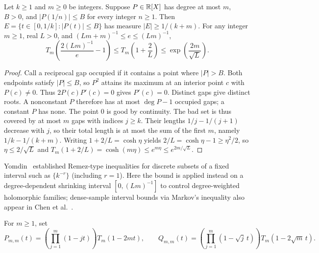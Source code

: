 \begin{theorem}
\label{thm:chebyshev-exp}
\leanok
Let $k\ge1$ and $m\ge0$ be integers. Suppose $P\in\mathbb{R}[X]$ has degree at most $m$, $B>0$, and $|P(1/n)|\le B$ for every integer $n\ge1$. Then $E=\{t\in[0,1/k]:|P(t)|\le B\}$ has measure $|E|\ge1/(k+m)$. For any integer $m\ge1$, real $L>0$, and $(Lm+m)^{-1}\le e\le(Lm)^{-1}$,
\[
T_m\!\left(\frac{2(Lm)^{-1}}{e} - 1\right) \le T_m\!\left(1 + \frac{2}{L}\right) \le \exp\!\left(\frac{2m}{\sqrt{L}}\right).
\]
\end{theorem}

\begin{proof}
Call a reciprocal gap occupied if it contains a point where $|P|>B$. Both endpoints satisfy $|P|\le B$, so $P^2$ attains its maximum at an interior point $c$ with $P(c)\ne0$. Thus $2P(c)P'(c)=0$ gives $P'(c)=0$. Distinct gaps give distinct roots. A nonconstant $P$ therefore has at most $\deg P-1$ occupied gaps; a constant $P$ has none. The point $0$ is good by continuity. The bad set is thus covered by at most $m$ gaps with indices $j\ge k$. Their lengths $1/j-1/(j+1)$ decrease with $j$, so their total length is at most the sum of the first $m$, namely $1/k-1/(k+m)$. Writing $1 + 2/L = \cosh\eta$ yields $2/L = \cosh\eta - 1 \ge \eta^2/2$, so $\eta \le 2/\sqrt{L}$ and $T_m(1+2/L) = \cosh(m\eta) \le e^{m\eta} \le e^{2m/\sqrt{L}}$.
\end{proof}

\begin{remark}
Yomdin~\cite{yomdin2009} established Remez-type inequalities for discrete subsets of a fixed interval such as $\{k^{-r}\}$ (including $r = 1$). Here the bound is applied instead on a degree-dependent shrinking interval $[0, (Lm)^{-1}]$ to control degree-weighted holomorphic families; dense-sample interval bounds via Markov's inequality also appear in Chen et al.~\cite[Lemma~4.2]{chen2024}.
\end{remark}

\begin{definition}
\label{def:sharpness-witnesses}
\leanok
For $m \ge 1$, set
\[
P_{m,m}(t) = \left(\prod_{j=1}^m (1 - jt)\right) T_m(1 - 2mt), \qquad
Q_{m,m}(t) = \left(\prod_{j=1}^m (1 - \sqrt{j}\,t)\right) T_m(1 - 2\sqrt{m}\,t).
\]
\end{definition}

